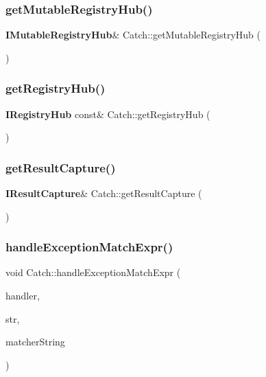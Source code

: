 \mbox{\label{namespace_catch_ac9ddcc6d66079add9cb2a3140b8ae51e}} 
\subsubsection{getMutableRegistryHub()}
{\footnotesize\ttfamily \textbf{ I\+Mutable\+Registry\+Hub}\& Catch\+::get\+Mutable\+Registry\+Hub (\begin{DoxyParamCaption}{ }\end{DoxyParamCaption})}

\mbox{\label{namespace_catch_a6332c92ab0c3952586b22cb96fdb8d44}} 
\subsubsection{getRegistryHub()}
{\footnotesize\ttfamily \textbf{ I\+Registry\+Hub} const\& Catch\+::get\+Registry\+Hub (\begin{DoxyParamCaption}{ }\end{DoxyParamCaption})}

\mbox{\label{namespace_catch_aff60c1de6ac6cea30175d70e33d83c8e}} 
\subsubsection{getResultCapture()}
{\footnotesize\ttfamily \textbf{ I\+Result\+Capture}\& Catch\+::get\+Result\+Capture (\begin{DoxyParamCaption}{ }\end{DoxyParamCaption})}

\mbox{\label{namespace_catch_aea6f8ff3b3838829d4a61694e4bc41ca}} 
\subsubsection{handleExceptionMatchExpr()\hspace{0.1cm}{\footnotesize\ttfamily [1/2]}}
{\footnotesize\ttfamily void Catch\+::handle\+Exception\+Match\+Expr (\begin{DoxyParamCaption}\item[{\textbf{ Assertion\+Handler} \&}]{handler,  }\item[{std\+::string const \&}]{str,  }\item[{\textbf{ String\+Ref} const \&}]{matcher\+String }\end{DoxyParamCaption})}

